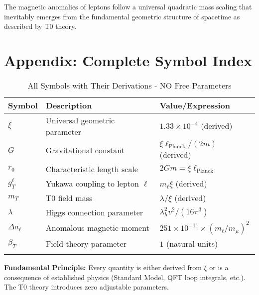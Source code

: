 \documentclass[12pt,a4paper]{article}
\begin{document}
	The magnetic anomalies of leptons follow a universal quadratic mass scaling that inevitably emerges from the fundamental geometric structure of spacetime as described by T0 theory.
	
	\newpage
	\section*{Appendix: Complete Symbol Index}
	
	\begin{longtable}{p{2.5cm} p{8cm} p{4.5cm}}
		\toprule
		\textbf{Symbol} & \textbf{Description} & \textbf{Value/Expression} \\
		\midrule
		\endhead
		$\xi$ & Universal geometric parameter & $1.33 \times 10^{-4}$ (derived) \\
		$G$ & Gravitational constant & $\xi \ell_{\text{Planck}}/(2m)$ (derived) \\
		$r_0$ & Characteristic length scale & $2Gm = \xi \ell_{\text{Planck}}$ \\
		$g_T^\ell$ & Yukawa coupling to lepton $\ell$ & $m_\ell \xi$ (derived) \\
		$m_T$ & T0 field mass & $\lambda/\xi$ (derived) \\
		$\lambda$ & Higgs connection parameter & $\lambda_h^2 v^2/(16\pi^3)$ \\
		$\Delta a_\ell$ & Anomalous magnetic moment & $251 \times 10^{-11} \times (m_\ell/m_\mu)^2$ \\
		$\beta_T$ & Field theory parameter & $1$ (natural units) \\
		\bottomrule
		\caption{All Symbols with Their Derivations - NO Free Parameters}
	\end{longtable}
	
	\textbf{Fundamental Principle:} Every quantity is either derived from $\xi$ or is a consequence of established physics (Standard Model, QFT loop integrals, etc.). The T0 theory introduces zero adjustable parameters.
	
\end{document}
